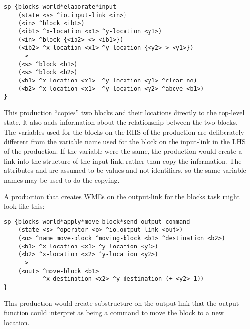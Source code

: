 \begin{verbatim}
sp {blocks-world*elaborate*input
    (state <s> ^io.input-link <in>)
    (<in> ^block <ib1>)
    (<ib1> ^x-location <x1> ^y-location <y1>)
    (<in> ^block {<ib2> <> <ib1>})
    (<ib2> ^x-location <x1> ^y-location {<y2> > <y1>})
    -->
    (<s> ^block <b1>)
    (<s> ^block <b2>)
    (<b1> ^x-location <x1>  ^y-location <y1> ^clear no)
    (<b2> ^x-location <x1>  ^y-location <y2> ^above <b1>)
}
\end{verbatim} 
\vspace{12pt}

This production ``copies'' two blocks and their locations directly to the top-level state. 
It also adds information about the relationship between the two blocks.  The variables used for the blocks on the RHS of the production are deliberately different from the variable name used for the block on the input-link in the LHS of the production. If the variable were the same, the production would create a link into the structure of the input-link, rather than copy the information. The attributes  and  are assumed to be values and not identifiers, so the same variable names may be used to do the copying.

A production that creates WMEs on the output-link for the blocks task might look like this:

\begin{verbatim}
sp {blocks-world*apply*move-block*send-output-command
    (state <s> ^operator <o> ^io.output-link <out>)
    (<o> ^name move-block ^moving-block <b1> ^destination <b2>)
    (<b1> ^x-location <x1> ^y-location <y1>)
    (<b2> ^x-location <x2> ^y-location <y2>)
    -->
    (<out> ^move-block <b1>
           ^x-destination <x2> ^y-destination (+ <y2> 1))
}
\end{verbatim} 
\vspace{12pt}

This production would create substructure on the output-link that the output function could interpret as being a command to move the block to a new location.


